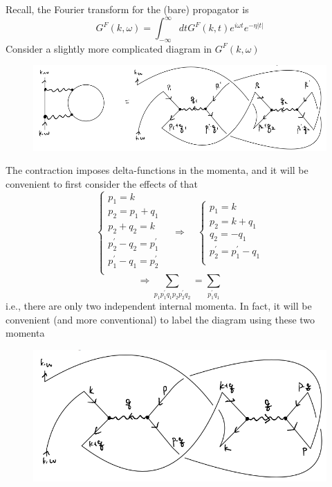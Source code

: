 Recall, the Fourier transform for the (bare) propagator is
\[ G^F\left( k,\omega \right) =\int_{-\infty}^{\infty}{dtG^F\left( k,t \right) e^{i\omega t}e^{-\eta \left| t \right|}}\]
Consider a slightly more complicated diagram in $G^F(k,\omega)$
\begin{figure}[H]
    \centering
    \includegraphics[width=\textwidth]{jupyterbook/data/fig/lec18-fig01.png}
\end{figure}
The contraction imposes delta-functions in the momenta, and it will be convenient to first consider the effects of that
\[ \begin{cases}
	p_1=k\\
	p_2=p_1+q_1\\
	p_2+q_2=k\\
	p_{2}^{'}-q_2=p_{1}^{'}\\
	p_{1}^{'}-q_1=p_{2}^{'}\\
\end{cases}\quad \Rightarrow \quad \begin{cases}
	p_1=k\\
	p_2=k+q_1\\
	q_2=-q_1\\
	p_{2}^{'}=p_{1}^{'}-q_1\\
\end{cases}\]
\[ \Rightarrow \sum_{p_1p_{1}^{'}q_1p_2p_{2}^{'}q_2}{}=\sum_{p_{1}^{'}q_1}{}\]
i.e., there are only two independent internal momenta. In fact, it will be convenient (and more conventional) to label the diagram using these two momenta
\begin{figure}[H]
    \centering
    \includegraphics[width=\textwidth]{jupyterbook/data/fig/lec18-fig02.png}
\end{figure}
